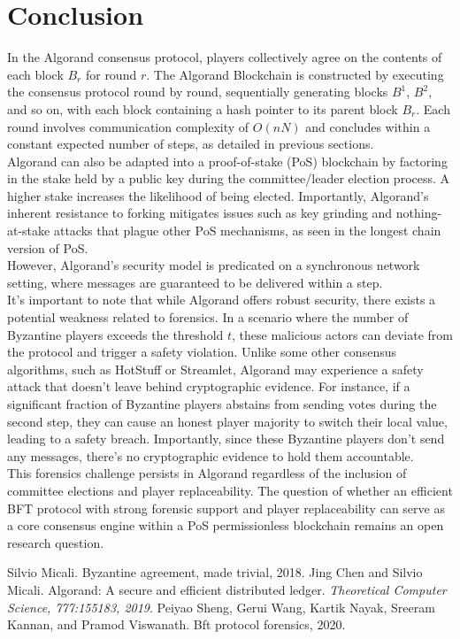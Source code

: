 \section{Conclusion}
In the Algorand consensus protocol, players collectively agree on the contents of each block $B_{r}$ for round $r$. The Algorand Blockchain is constructed by executing the consensus protocol round by round, sequentially generating blocks $B^{1}$, $B^{2}$, and so on, with each block containing a hash pointer to its parent block $B_{r}$. Each round involves communication complexity of $O(nN)$ and concludes within a constant expected number of steps, as detailed in previous sections.\\
Algorand can also be adapted into a proof-of-stake (PoS) blockchain by factoring in the stake held by a public key during the committee/leader election process. A higher stake increases the likelihood of being elected. Importantly, Algorand's inherent resistance to forking mitigates issues such as key grinding and nothing-at-stake attacks that plague other PoS mechanisms, as seen in the longest chain version of PoS.\\
However, Algorand's security model is predicated on a synchronous network setting, where messages are guaranteed to be delivered within a step.\\
It's important to note that while Algorand offers robust security, there exists a potential weakness related to forensics. In a scenario where the number of Byzantine players exceeds the threshold $t$, these malicious actors can deviate from the protocol and trigger a safety violation. Unlike some other consensus algorithms, such as HotStuff or Streamlet, Algorand may experience a safety attack that doesn't leave behind cryptographic evidence. For instance, if a significant fraction of Byzantine players abstains from sending votes during the second step, they can cause an honest player majority to switch their local value, leading to a safety breach. Importantly, since these Byzantine players don't send any messages, there's no cryptographic evidence to hold them accountable.\\
This forensics challenge persists in Algorand regardless of the inclusion of committee elections and player replaceability. The question of whether an efficient BFT protocol with strong forensic support and player replaceability can serve as a core consensus engine within a PoS permissionless blockchain remains an open research question.

\renewcommand{\bibname}{References}
\begin{thebibliography}{9}
	 Silvio Micali. Byzantine agreement, made trivial, 2018.
	 Jing Chen and Silvio Micali. Algorand: A secure and efficient distributed ledger. \textit{Theoretical Computer Science, 777:155183, 2019}.
	 Peiyao Sheng, Gerui Wang, Kartik Nayak, Sreeram Kannan, and Pramod Viswanath. Bft protocol forensics, 2020.
\end{thebibliography}